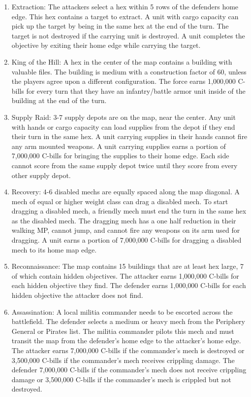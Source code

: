 \documentclass{article}
\begin{document}
\begin{enumerate}

\item Extraction: The attackers select a hex within 5 rows of the defenders home edge.
This hex contains a target to extract.
A unit with cargo capacity can pick up the target by being in the same hex at the end of the turn.
The target is not destroyed if the carrying unit is destroyed.
A unit completes the objective by exiting their home edge while carrying the target.

\item King of the Hill: A hex in the center of the map contains a building with valuable files.
The building is medium with a construction factor of 60, unless the players agree upon a different configuration.
The force earns 1,000,000 C-bills for every turn that they have an infantry/battle armor unit inside of the building at the end of the turn.

\item Supply Raid: 3-7 supply depots are on the map, near the center.
Any unit with hands or cargo capacity can load supplies from the depot if they end their turn in the same hex.
A unit carrying supplies in their hands cannot fire any arm mounted weapons.
A unit carrying supplies earns a portion of 7,000,000 C-bills for bringing the supplies to their home edge.
Each side cannot score from the same supply depot twice until they score from every other supply depot.

\item Recovery: 4-6 disabled mechs are equally spaced along the map diagonal.
A mech of equal or higher weight class can drag a disabled mech.
To start dragging a disabled mech, a friendly mech must end the turn in the same hex as the disabled mech.
The dragging mech has a one half reduction in their walking MP, cannot jump, and cannot fire any weapons on its arm used for dragging.
A unit earns a portion of 7,000,000 C-bills for dragging a disabled mech to its home map edge.

\item Reconnaissance: The map contains 15 buildings that are at least hex large, 7 of which contain hidden objectives.
The attacker earns 1,000,000 C-bills for each hidden objective they find.
The defender earns 1,000,000 C-bills for each hidden objective the attacker does not find.

\item Assassination: A local militia commander needs to be escorted across the battlefield.
The defender selects a medium or heavy mech from the Periphery General or Pirates list.
The militia commander pilots this mech and must transit the map from the defender's home edge to the attacker's home edge.
The attacker earns 7,000,000 C-bills if the commander's mech is destroyed or 3,500,000 C-bills if the commander's mech receives crippling damage.
The defender 7,000,000 C-bills if the commander's mech does not receive crippling damage  or 3,500,000 C-bills if the commander's mech is crippled but not destroyed.

\end{enumerate}
\end{document}
